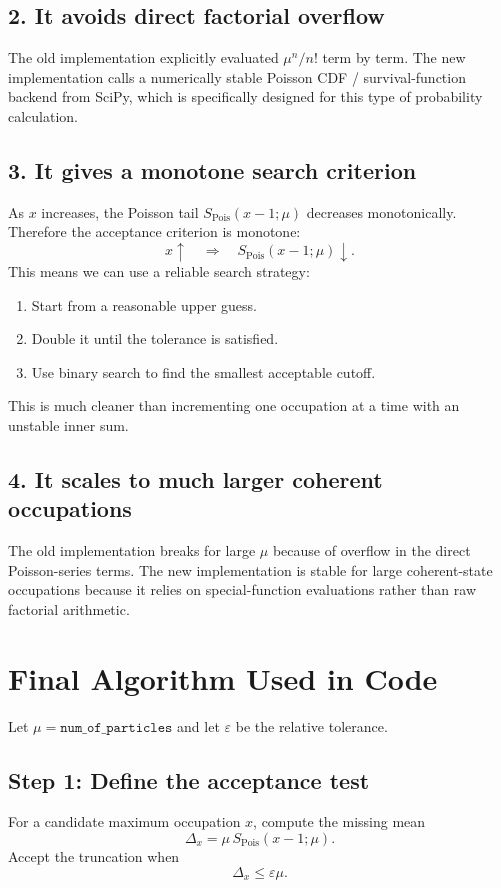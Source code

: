 \documentclass[12pt]{article}
\begin{document}
\subsection*{2. It avoids direct factorial overflow}
The old implementation explicitly evaluated $\mu^n/n!$ term by term. The new implementation calls a numerically stable Poisson CDF / survival-function backend from SciPy, which is specifically designed for this type of probability calculation.

\subsection*{3. It gives a monotone search criterion}
As $x$ increases, the Poisson tail $S_{\text{Pois}}(x-1;\mu)$ decreases monotonically. Therefore the acceptance criterion is monotone:
\[
x \uparrow \quad \Longrightarrow \quad S_{\text{Pois}}(x-1;\mu)\downarrow.
\]
This means we can use a reliable search strategy:
\begin{enumerate}
\item Start from a reasonable upper guess.
\item Double it until the tolerance is satisfied.
\item Use binary search to find the smallest acceptable cutoff.
\end{enumerate}
This is much cleaner than incrementing one occupation at a time with an unstable inner sum.

\subsection*{4. It scales to much larger coherent occupations}
The old implementation breaks for large $\mu$ because of overflow in the direct Poisson-series terms. The new implementation is stable for large coherent-state occupations because it relies on special-function evaluations rather than raw factorial arithmetic.

\section*{Final Algorithm Used in Code}
Let $\mu = \texttt{num\_of\_particles}$ and let $\varepsilon$ be the relative tolerance.

\subsection*{Step 1: Define the acceptance test}
For a candidate maximum occupation $x$, compute the missing mean
\[
\Delta_x = \mu\,S_{\text{Pois}}(x-1;\mu).
\]
Accept the truncation when
\[
\Delta_x \le \varepsilon \mu.
\]
\end{document}
